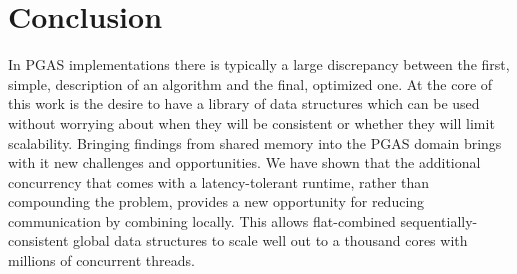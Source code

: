 \section{Conclusion}
In PGAS implementations there is typically a large discrepancy between the first, simple, description of an algorithm and the final, optimized one. At the core of this work is the desire to have a library of data structures which can be used without worrying about when they will be consistent or whether they will limit scalability.
Bringing findings from shared memory into the PGAS domain brings with it new challenges and opportunities.
We have shown that the additional concurrency that comes with a latency-tolerant runtime, rather than compounding the problem, provides a new opportunity for reducing communication by combining locally.
This allows flat-combined sequentially-consistent global data structures to scale well out to a thousand cores with millions of concurrent threads.
